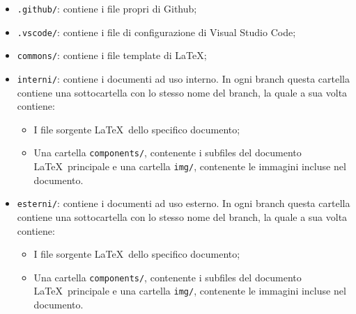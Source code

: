 \documentclass[../norme-di-progetto.tex]{subfiles}
\begin{document}
\begin{itemize}
\item \texttt{.github/}: contiene i file propri di Github;
  \item \texttt{.vscode/}: contiene i file di configurazione di Visual Studio Code;
  \item \texttt{commons/}: contiene i file template di \LaTeX;
  \item \texttt{interni/}: contiene i documenti ad uso interno. In ogni branch questa cartella contiene una sottocartella con lo stesso nome del branch, la quale a sua volta contiene:
  \begin{itemize}
  \item I file sorgente \LaTeX\ dello specifico documento;
  \item Una cartella \texttt{components/}, contenente i subfiles del documento \LaTeX\ principale e una cartella \texttt{img/}, contenente le immagini incluse nel documento.
  \end{itemize}
  \item \texttt{esterni/}: contiene i documenti ad uso esterno. In ogni branch questa cartella contiene una sottocartella con lo stesso nome del branch, la quale a sua volta contiene:
  \begin{itemize}
  \item I file sorgente \LaTeX\ dello specifico documento;
  \item Una cartella \texttt{components/}, contenente i subfiles del documento \LaTeX\ principale e una cartella \texttt{img/}, contenente le immagini incluse nel documento.
  \end{itemize}
\end{itemize}
\end{document}
